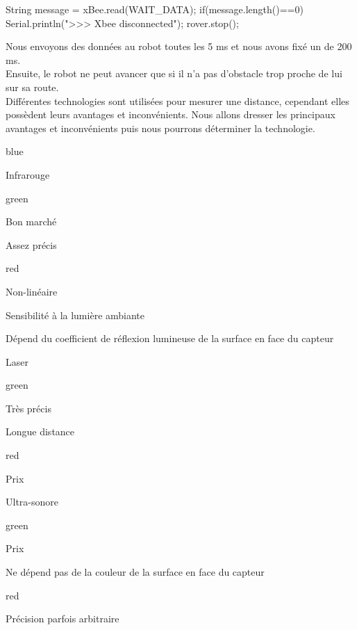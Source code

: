 {\begin{Cpp}
  String message = xBee.read(WAIT_DATA);  
  if(message.length()==0)
  {
    Serial.println(">>> Xbee disconnected");
    rover.stop();
  }
\end{Cpp}

Nous envoyons des données au robot toutes les 5 ms et nous avons fixé un  de 200 ms.\\

Ensuite, le robot ne peut avancer que si il n'a pas d'obstacle trop proche de lui sur sa route.\\
Différentes technologies sont utilisées pour mesurer une distance, cependant elles possèdent leurs avantages et inconvénients. Nous allons dresser les principaux avantages et inconvénients puis nous pourrons déterminer la technologie.

\begin{items}{blue}{\Circle}
    \item Infrarouge
    \begin{items}{green}{\Circle}
        \item Bon marché
        \item Assez précis
    \end{items}
    \begin{items}{red}{\Circle}
        \item Non-linéaire
        \item Sensibilité à la lumière ambiante
        \item Dépend du coefficient de réflexion lumineuse de la surface en face du capteur
    \end{items}

    \item Laser
    \begin{items}{green}{\Circle}
        \item Très précis
        \item Longue distance
    \end{items}
    \begin{items}{red}{\Circle}
        \item Prix
    \end{items}

    \item Ultra-sonore
    \begin{items}{green}{\Circle}
        \item Prix
        \item Ne dépend pas de la couleur de la surface en face du capteur
    \end{items}
    \begin{items}{red}{\Circle}
        \item Précision parfois arbitraire
    \end{items}
\end{items}

}
